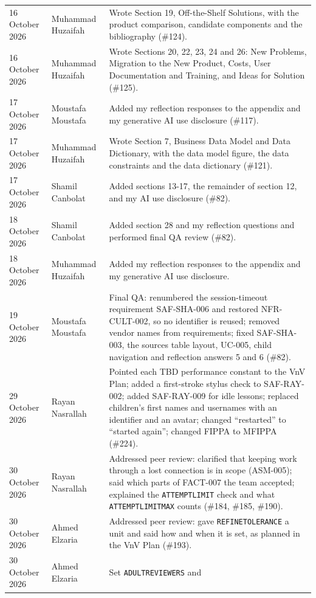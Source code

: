 \documentclass[12pt]{article}
\renewcommand{\_}{\textunderscore\allowbreak}%
\begin{document}
\begin{longtable}{@{}p{3cm}p{3cm}>{\raggedright\arraybackslash}p{\dimexpr\textwidth-6cm-4\tabcolsep\relax}@{}}
16 October 2026 & Muhammad Huzaifah & Wrote Section 19, Off-the-Shelf Solutions,
with the product comparison, candidate components and the bibliography
(\#124).\\
16 October 2026 & Muhammad Huzaifah & Wrote Sections 20, 22, 23, 24 and 26: New
Problems, Migration to the New Product, Costs, User Documentation and Training,
and Ideas for Solution (\#125).\\
17 October 2026 & Moustafa Moustafa & Added my reflection responses to the
appendix and my generative AI use disclosure (\#117).\\
17 October 2026 & Muhammad Huzaifah & Wrote Section 7, Business Data Model and
Data Dictionary, with the data model figure, the data constraints and the data
dictionary (\#121).\\
17 October 2026 & Shamil Canbolat & Added sections 13-17, the remainder of
section 12, and my AI use disclosure (\#82). \\
18 October 2026 & Shamil Canbolat & Added section 28 and my reflection questions
and performed final QA review (\#82). \\
18 October 2026 & Muhammad Huzaifah & Added my reflection responses to the
appendix and my generative AI use disclosure.\\
19 October 2026 & Moustafa Moustafa & Final QA: renumbered the session-timeout
requirement SAF-SHA-006 and restored NFR-CULT-002, so no identifier is reused;
removed vendor names from requirements; fixed SAF-SHA-003, the sources table
layout, UC-005, child navigation and reflection answers 5 and 6 (\#82).\\
29 October 2026 & Rayan Nasrallah & Pointed each TBD performance constant to
the VnV Plan; added a first-stroke stylus check to SAF-RAY-002; added
SAF-RAY-009 for idle lessons; replaced children's first names and usernames
with an identifier and an avatar; changed ``restarted'' to ``started again'';
changed FIPPA to MFIPPA (\#224).\\
30 October 2026 & Rayan Nasrallah & Addressed peer review: clarified that
keeping work through a lost connection is in scope (ASM-005); said which parts
of FACT-007 the team accepted; explained the \texttt{ATTEMPT\_LIMIT} check and
what \texttt{ATTEMPT\_LIMIT\_MAX} counts (\#184, \#185, \#190).\\
30 October 2026 & Ahmed Elzaria & Addressed peer review: gave
\texttt{REFINE\_TOLERANCE} a unit and said how and when it is set, as planned in
the VnV Plan (\#193).\\
30 October 2026 & Ahmed Elzaria & Set \texttt{ADULT\_REVIEWERS} and

\end{longtable}
\end{document}
